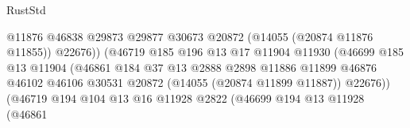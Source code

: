 \begin{lexlean}{RustStd}
\begin{coremodule}
                                                  @11876
                                                  @46838
                                                  @29873
                                                  @29877
                                                  @30673
                                                  @20872
                                                  (@14055 (@20874 @11876 @11855))
                                                  @22676))
                                              (@46719
                                                @185
                                                @196
                                                @13
                                                @17
                                                @11904
                                                @11930
                                                (@46699
                                                  @185
                                                  @13
                                                  @11904
                                                  (@46861
                                                    @184
                                                    @37
                                                    @13
                                                    @2888
                                                    @2898
                                                    @11886
                                                    @11899
                                                    @46876
                                                    @46102
                                                    @46106
                                                    @30531
                                                    @20872
                                                    (@14055 (@20874 @11899 @11887))
                                                    @22676))
                                                (@46719
                                                  @194
                                                  @104
                                                  @13
                                                  @16
                                                  @11928
                                                  @2822
                                                  (@46699
                                                    @194
                                                    @13
                                                    @11928
                                                    (@46861

\end{coremodule}
\end{lexlean}
